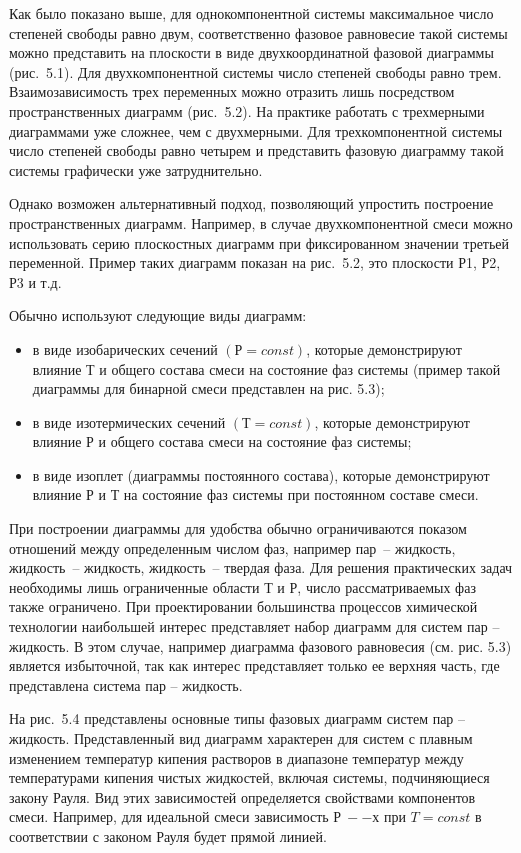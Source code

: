 Как было показано выше, для однокомпонентной системы максимальное число степеней свободы равно двум, соответственно фазовое равновесие такой системы можно представить на плоскости в виде двухкоординатной фазовой диаграммы (рис. 5.1). Для двухкомпонентной системы число степеней свободы равно трем. Взаимозависимость трех переменных можно отразить лишь посредством пространственных диаграмм (рис. 5.2). На практике работать с трехмерными диаграммами уже сложнее, чем с двухмерными. Для трехкомпонентной системы число степеней свободы равно четырем и представить фазовую диаграмму такой системы графически уже затруднительно. 

Однако возможен альтернативный подход, позволяющий упростить построение пространственных диаграмм. Например, в случае двухкомпонентной смеси можно использовать серию плоскостных диаграмм при фиксированном значении третьей переменной. Пример таких диаграмм показан на рис. 5.2, это плоскости Р1, Р2, Р3 и т.д.

Обычно используют следующие виды диаграмм:
\begin{itemize}
\item в виде изобарических сечений $(Р = const)$, которые демонстрируют влияние $Т$ и общего состава смеси на состояние фаз системы (пример такой диаграммы для бинарной смеси представлен на рис. 5.3); 
\item в виде изотермических сечений $(Т = const)$, которые демонстрируют влияние $Р$ и общего состава смеси на состояние фаз системы;
\item в виде изоплет (диаграммы постоянного состава), которые демонстрируют влияние $Р$ и $Т$ на состояние фаз системы при постоянном составе смеси.	
\end{itemize} 

При построении диаграммы для удобства обычно ограничиваются показом отношений между определенным числом фаз, например пар~-- жидкость, жидкость~-- жидкость, жидкость~-- твердая фаза. Для решения практических задач необходимы лишь ограниченные области $Т$ и $Р$, число рассматриваемых фаз также ограничено. При проектировании большинства процессов химической технологии наибольшей интерес представляет набор диаграмм для систем пар – жидкость. В этом случае, например диаграмма фазового равновесия (см. рис. 5.3) является избыточной, так как интерес представляет только ее верхняя часть, где представлена система пар – жидкость. 

На рис. 5.4 представлены основные типы фазовых диаграмм систем пар – жидкость. Представленный вид диаграмм характерен для систем с плавным изменением температур кипения растворов в диапазоне температур между температурами кипения чистых жидкостей, включая системы, подчиняющиеся закону Рауля. Вид этих зависимостей определяется свойствами компонентов смеси. Например, для идеальной смеси зависимость $Р~-- х$ при $T=const$ в соответствии с законом Рауля будет прямой линией.

